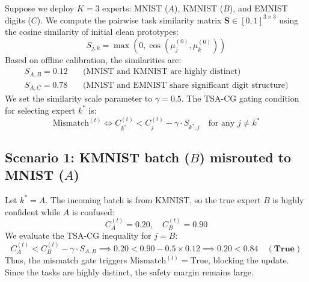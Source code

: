 \documentclass{article}
\theoremstyle{plain}
\theoremstyle{definition}
\theoremstyle{remark}
\begin{document}
Suppose we deploy $K=3$ experts: MNIST ($A$), KMNIST ($B$), and EMNIST digits ($C$).
We compute the pairwise task similarity matrix $\mathbf{S} \in [0, 1]^{3 \times 3}$ using the cosine similarity of initial clean prototypes:
\begin{equation}
    S_{j,k} = \max\left(0, \cos\left(\mu_j^{(0)}, \mu_k^{(0)}\right)\right)
\end{equation}
Based on offline calibration, the similarities are:
\begin{align}
    S_{A,B} = 0.12 \quad &\text{(MNIST and KMNIST are highly distinct)} \\
    S_{A,C} = 0.78 \quad &\text{(MNIST and EMNIST share significant digit structure)}
\end{align}
We set the similarity scale parameter to $\gamma = 0.5$. The TSA-CG gating condition for selecting expert $k^*$ is:
\begin{equation}
    \text{Mismatch}^{(t)} \iff C_{k^*}^{(t)} < C_j^{(t)} - \gamma \cdot S_{k^*, j} \quad \text{for any } j \neq k^*
\end{equation}

\subsection{Scenario 1: KMNIST batch ($B$) misrouted to MNIST ($A$)}
Let $k^* = A$. The incoming batch is from KMNIST, so the true expert $B$ is highly confident while $A$ is confused:
\begin{equation}
    C_A^{(t)} = 0.20, \quad C_B^{(t)} = 0.90
\end{equation}
We evaluate the TSA-CG inequality for $j = B$:
\begin{equation}
    C_A^{(t)} < C_B^{(t)} - \gamma \cdot S_{A,B} \implies 0.20 < 0.90 - 0.5 \times 0.12 \implies 0.20 < 0.84 \quad (\mathbf{True})
\end{equation}
Thus, the mismatch gate triggers $\text{Mismatch}^{(t)} = \text{True}$, blocking the update. Since the tasks are highly distinct, the safety margin remains large.
\end{document}
